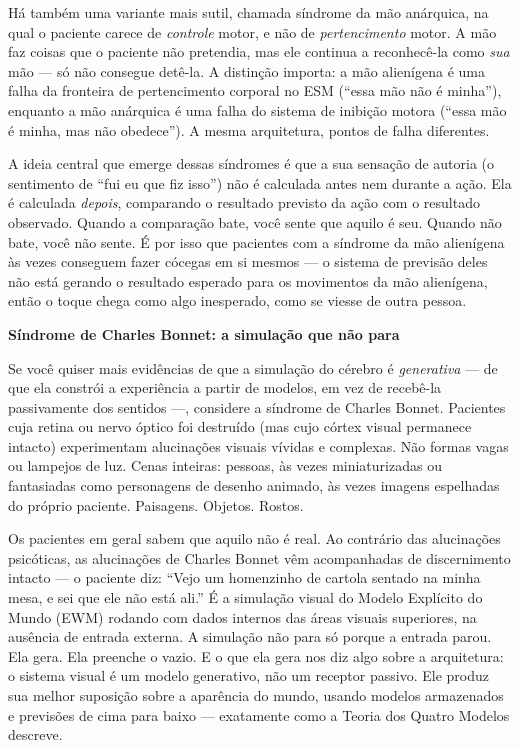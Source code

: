 \documentclass[11pt, twoside, openright]{book}
\begin{document}
Há também uma variante mais sutil, chamada síndrome da mão anárquica, na qual o paciente carece de \textit{controle} motor, e não de \textit{pertencimento} motor. A mão faz coisas que o paciente não pretendia, mas ele continua a reconhecê-la como \textit{sua} mão --- só não consegue detê-la. A distinção importa: a mão alienígena é uma falha da fronteira de pertencimento corporal no ESM (``essa mão não é minha''), enquanto a mão anárquica é uma falha do sistema de inibição motora (``essa mão é minha, mas não obedece''). A mesma arquitetura, pontos de falha diferentes.

A ideia central que emerge dessas síndromes é que a sua sensação de autoria (o sentimento de ``fui eu que fiz isso'') não é calculada antes nem durante a ação. Ela é calculada \textit{depois}, comparando o resultado previsto da ação com o resultado observado. Quando a comparação bate, você sente que aquilo é seu. Quando não bate, você não sente. É por isso que pacientes com a síndrome da mão alienígena às vezes conseguem fazer cócegas em si mesmos --- o sistema de previsão deles não está gerando o resultado esperado para os movimentos da mão alienígena, então o toque chega como algo inesperado, como se viesse de outra pessoa.

\textbf{Síndrome de Charles Bonnet: a simulação que não para}

Se você quiser mais evidências de que a simulação do cérebro é \textit{generativa} --- de que ela constrói a experiência a partir de modelos, em vez de recebê-la passivamente dos sentidos ---, considere a síndrome de Charles Bonnet. Pacientes cuja retina ou nervo óptico foi destruído (mas cujo córtex visual permanece intacto) experimentam alucinações visuais vívidas e complexas. Não formas vagas ou lampejos de luz. Cenas inteiras: pessoas, às vezes miniaturizadas ou fantasiadas como personagens de desenho animado, às vezes imagens espelhadas do próprio paciente. Paisagens. Objetos. Rostos.

Os pacientes em geral sabem que aquilo não é real. Ao contrário das alucinações psicóticas, as alucinações de Charles Bonnet vêm acompanhadas de discernimento intacto --- o paciente diz: ``Vejo um homenzinho de cartola sentado na minha mesa, e sei que ele não está ali.'' É a simulação visual do Modelo Explícito do Mundo (EWM) rodando com dados internos das áreas visuais superiores, na ausência de entrada externa. A simulação não para só porque a entrada parou. Ela gera. Ela preenche o vazio. E o que ela gera nos diz algo sobre a arquitetura: o sistema visual é um modelo generativo, não um receptor passivo. Ele produz sua melhor suposição sobre a aparência do mundo, usando modelos armazenados e previsões de cima para baixo --- exatamente como a Teoria dos Quatro Modelos descreve.
\end{document}
